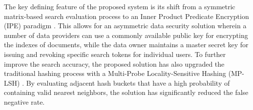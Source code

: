 The key defining feature of the proposed system is its shift from a symmetric matrix-based search evaluation process to an Inner Product Predicate Encryption (IPE) paradigm \cite{shen2009predicate}. This allows for an asymmetric data security solution wherein a number of data providers can use a commonly available public key for encrypting the indexes of documents, while the data owner maintains a master secret key for issuing and revoking specific search tokens for individual users. To further improve the search accuracy, the proposed solution has also upgraded the traditional hashing process with a Multi-Probe Locality-Sensitive Hashing (MP-LSH) \cite{lv2007multi}. By evaluating adjacent hash buckets that have a high probability of containing valid nearest neighbors, the solution has significantly reduced the false negative rate.